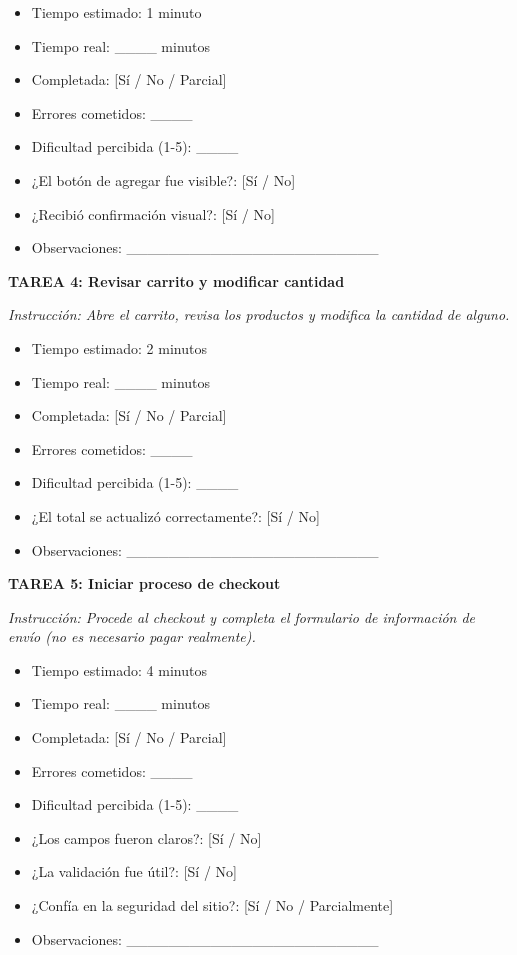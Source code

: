 \documentclass[12pt,a4paper]{article}
\begin{document}
\begin{itemize}
    \item Tiempo estimado: 1 minuto
    \item Tiempo real: \_\_\_\_ minutos
    \item Completada: [Sí / No / Parcial]
    \item Errores cometidos: \_\_\_\_
    \item Dificultad percibida (1-5): \_\_\_\_
    \item ¿El botón de agregar fue visible?: [Sí / No]
    \item ¿Recibió confirmación visual?: [Sí / No]
    \item Observaciones: \_\_\_\_\_\_\_\_\_\_\_\_\_\_\_\_\_\_\_\_\_\_\_\_
\end{itemize}

\textbf{TAREA 4: Revisar carrito y modificar cantidad}

\textit{Instrucción: Abre el carrito, revisa los productos y modifica la cantidad de alguno.}

\begin{itemize}
    \item Tiempo estimado: 2 minutos
    \item Tiempo real: \_\_\_\_ minutos
    \item Completada: [Sí / No / Parcial]
    \item Errores cometidos: \_\_\_\_
    \item Dificultad percibida (1-5): \_\_\_\_
    \item ¿El total se actualizó correctamente?: [Sí / No]
    \item Observaciones: \_\_\_\_\_\_\_\_\_\_\_\_\_\_\_\_\_\_\_\_\_\_\_\_
\end{itemize}

\textbf{TAREA 5: Iniciar proceso de checkout}

\textit{Instrucción: Procede al checkout y completa el formulario de información de envío (no es necesario pagar realmente).}

\begin{itemize}
    \item Tiempo estimado: 4 minutos
    \item Tiempo real: \_\_\_\_ minutos
    \item Completada: [Sí / No / Parcial]
    \item Errores cometidos: \_\_\_\_
    \item Dificultad percibida (1-5): \_\_\_\_
    \item ¿Los campos fueron claros?: [Sí / No]
    \item ¿La validación fue útil?: [Sí / No]
    \item ¿Confía en la seguridad del sitio?: [Sí / No / Parcialmente]
    \item Observaciones: \_\_\_\_\_\_\_\_\_\_\_\_\_\_\_\_\_\_\_\_\_\_\_\_
\end{itemize}
\end{document}
